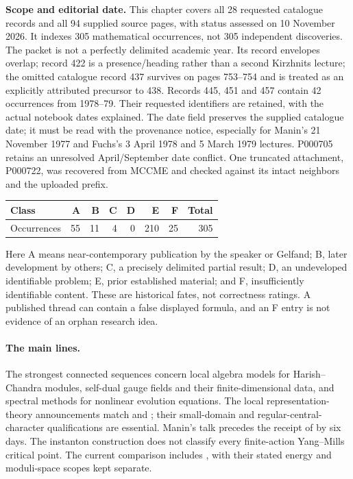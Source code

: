 \noindent\textbf{Scope and editorial date.}
This chapter covers all 28 requested catalogue records and all 94 supplied
source pages, with status assessed on 10 November 2026. It indexes 305
mathematical occurrences, not 305 independent discoveries. The packet is
not a perfectly delimited academic year. Its record envelopes overlap;
record 422 is a presence/heading rather than a second Kirzhnits lecture;
the omitted catalogue record 437 survives on pages 753--754 and is treated
as an explicitly attributed precursor to 438. Records 445, 451 and 457
contain 42 occurrences from 1978--79. Their requested identifiers
are retained, with the actual notebook dates explained. The date field
preserves the supplied catalogue date; it must be read with the provenance
notice, especially for Manin's 21 November 1977 and Fuchs's 3 April 1978
and 5 March 1979 lectures. P000705 retains an unresolved April/September
date conflict. One truncated attachment, P000722, was recovered
from MCCME and checked against its intact neighbors and the uploaded prefix.

\begin{center}
\begin{tabular}{@{}lrrrrrrr@{}}
\toprule
Class & A & B & C & D & E & F & Total\\
\midrule
Occurrences & 55 & 11 & 4 & 0 & 210 & 25 & 305\\
\bottomrule
\end{tabular}
\end{center}
Here A means near-contemporary publication by the speaker or Gelfand;
B, later development by others; C, a precisely delimited partial result;
D, an undeveloped identifiable problem; E, prior established material;
and F, insufficiently identifiable content. These are historical fates,
not correctness ratings. A published thread can contain a false displayed
formula, and an F entry is not evidence of an orphan research idea.

\paragraph{The main lines.}
The strongest connected sequences concern local algebra models for
Harish--Chandra modules, self-dual gauge fields and their finite-dimensional
data, and spectral methods for nonlinear evolution equations. The local
representation-theory announcements match
\citet[Theorems~1--2]{bernsteingelfandgelfand1978local1} and
\citet[Theorem~1]{bernsteingelfandgelfand1978local2}; their small-domain
and regular-central-character qualifications are essential. Manin's talk
precedes the receipt of \citet{drinfeldmanin1978selfdual} by six days.
The instanton construction does not classify every finite-action
Yang--Mills critical point. The current comparison includes
\citet[Theorems~1.1--1.2]{dayapremawaldron2026parabolic}, with their stated
energy and moduli-space scopes kept separate.

